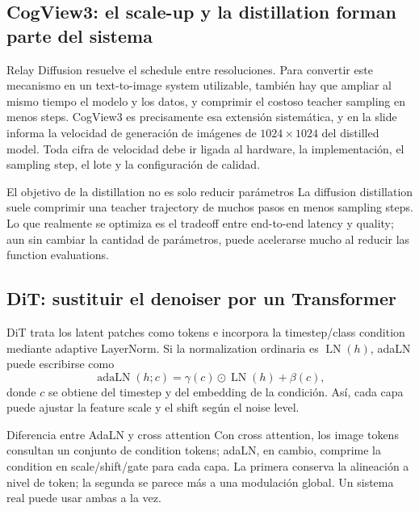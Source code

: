\subsection{CogView3: el scale-up y la distillation forman parte del sistema}

Relay Diffusion resuelve el schedule entre resoluciones. Para convertir este mecanismo en un text-to-image system utilizable, también hay que ampliar al mismo tiempo el modelo y los datos, y comprimir el costoso teacher sampling en menos steps. CogView3 es precisamente esa extensión sistemática, y en la slide informa la velocidad de generación de imágenes de $1024\!\times\!1024$ del distilled model. Toda cifra de velocidad debe ir ligada al hardware, la implementación, el sampling step, el lote y la configuración de calidad.


\begin{importantbox}{El objetivo de la distillation no es solo reducir parámetros}
La diffusion distillation suele comprimir una teacher trajectory de muchos pasos en menos sampling steps. Lo que realmente se optimiza es el tradeoff entre end-to-end latency y quality; aun sin cambiar la cantidad de parámetros, puede acelerarse mucho al reducir las function evaluations.
\end{importantbox}

\subsection{DiT: sustituir el denoiser por un Transformer}

DiT trata los latent patches como tokens e incorpora la timestep/class condition mediante adaptive LayerNorm. Si la normalization ordinaria es $\operatorname{LN}(h)$, adaLN puede escribirse como
\[
\operatorname{adaLN}(h;c)=\gamma(c)\odot\operatorname{LN}(h)+\beta(c),
\]
donde $c$ se obtiene del timestep y del embedding de la condición. Así, cada capa puede ajustar la feature scale y el shift según el noise level.


\begin{knowledgebox}{Diferencia entre AdaLN y cross attention}
Con cross attention, los image tokens consultan un conjunto de condition tokens; adaLN, en cambio, comprime la condition en scale/shift/gate para cada capa. La primera conserva la alineación a nivel de token; la segunda se parece más a una modulación global. Un sistema real puede usar ambas a la vez.
\end{knowledgebox}

